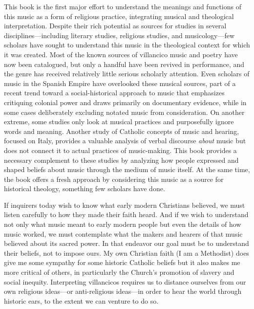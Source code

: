 This book is the first major effort to understand the meanings and functions of
this music as a form of religious practice, integrating musical and theological
interpretation.
Despite their rich potential as sources for studies in several
disciplines---including literary studies, religious studies, and
musicology---few scholars have sought to understand this music in the
theological context for which it was created.
Most of the known sources of villancico music and poetry have now been
catalogued, but only a handful have been revived in performance, and the
genre has received relatively little serious scholarly attention.%
    \Autocites
    {BNE:VCs17C}
    {BNE:VCs18C}
    {UK:VCs}
    {US:VCs}
    {Codina:MontserratVCs}
    {Pedrell:BNC}
    {Bonastre:CanetCatalog}
    {Ezquerro:CatalogoZaragoza}
    {LopezCalo:Segovia}
    {Stanford:Catalog}
    {Tello:SanchezGarzaCatalogo}
Even scholars of music in the Spanish Empire have overlooked these musical
sources, part of a recent trend toward a social-historical approach to music
that emphasizes critiquing colonial power and draws primarily on documentary
evidence, while in some cases deliberately excluding notated music from
consideration.%
    \Autocites
    {Baker:Harmony}
    {RamosKittrell:PlayingCathedral}
On another extreme, some studies only look at musical practices and
purposefully ignore words and meaning.%
    \Autocites
    {Rubio:Forma}
    {Swadley:VillancicoPhD}
Another study of Catholic concepts of music and hearing, focused on Italy,
provides a valuable analysis of verbal discourse \emph{about} music but does
not connect it to actual practices of music-making.%
    \Autocite{DellAntonio:Listening}
This book provides a necessary complement to these studies by analyzing how
people expressed and shaped beliefs about music through the medium of music
itself.
At the same time, the book offers a fresh approach by considering this music as
a source for historical theology, something few scholars have done.

If inquirers today wish to know what early modern Christians believed, we
must listen carefully to how they made their faith heard.
And if we wish to understand not only what music meant to early
modern people but even the details of how music worked, we must contemplate
what the makers and hearers of that music believed about its sacred power. 
In that endeavor our goal must be to understand their beliefs, not to impose
ours.
My own Christian faith (I am a Methodist) does give me some sympathy for
some historic Catholic beliefs but it also makes me more critical of others, in
particularly the Church's promotion of slavery and social inequity.
Interpreting villancicos requires us to distance ourselves from our own
religious ideas---or anti-religious ideas---in order to hear the world through
historic ears, to the extent we can venture to do so.%
    \Autocite{Burstyn:PeriodEar}

